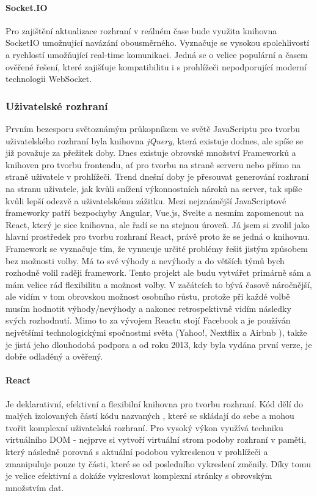 \paragraph{Socket.IO}\label{socketio} Pro zajištění aktualizace rozhraní v reálném čase bude využita knihovna SocketIO umožnující navázání obousměrného. Vyznačuje se vysokou spolehlivostí a rychlostí umožňující real-time komunikaci. Jedná se o velice populární a časem ověřené řešení, které zajišťuje kompatibilitu i s prohlížeči nepodporující moderní technologii WebSocket.


\subsubsection{Uživatelské rozhraní}
Prvním bezesporu světoznámým průkopníkem ve světě JavaScriptu pro tvorbu uživatelského rozhraní byla knihovna \textit{jQuery}, která existuje dodnes, ale spíše se již považuje za přežitek doby. Dnes existuje obrovské množství Frameworků a knihoven pro tvorbu frontendu, ať pro tvorbu na straně serveru nebo přímo na straně uživatele v prohlížeči. Trend dnešní doby je přesouvat generování rozhraní na stranu uživatele, jak kvůli snížení výkonnostních nároků na server, tak spíše kvůli lepší odezvě a uživatelskému zážitku. Mezi nejznámější JavaScriptové frameworky patří bezpochyby Angular, Vue.js, Svelte a nesmím zapomenout na React, který je sice knihovna, ale řadí se na stejnou úroveň. Já jsem si zvolil jako hlavní prostředek pro tvorbu rozhraní React, právě proto že se jedná o knihovnu. Framework se vyznačuje tím, že vynucuje určité problémy řešit jistým způsobem bez možnosti volby. Má to své výhody a nevýhody a do větších týmů bych rozhodně volil raději framework. Tento projekt ale budu vytvářet primárně sám a mám velice rád flexibilitu a možnost volby. V začátcích to bývá časově náročnější, ale vidím v tom obrovskou možnost osobního růstu, protože při každé volbě musím hodnotit výhody/nevýhody a nakonec retrospektivně vidím následky svých rozhodnutí. Mimo to za vývojem Reactu stojí Facebook a je používán největšími technologickými spočnostmi světa (Yahoo!, Nextflix a Airbnb \cite{react-companies}), takže je jistá jeho dlouhodobá podpora a od roku 2013, kdy byla vydána první verze, je dobře odladěný a ověřený.

\paragraph{React} Je deklarativní, efektivní a flexibilní knihovna pro tvorbu rozhraní. Kód dělí do malých izolovaných částí kódu nazvaných , které se skládají do sebe a mohou tvořit komplexní uživatelská rozhraní. Pro vysoký výkon využívá techniku virtuálního DOM - nejprve si vytvoří virtuální strom podoby rozhraní v paměti, který následně porovná s aktuální podobou vykreslenou v prohlížeči a zmanipuluje pouze ty části, které se od posledního vykreslení změnily. Díky tomu je velice efektivní a dokáže vykreslovat komplexní stránky s obrovským množstvím dat. \cite{react}